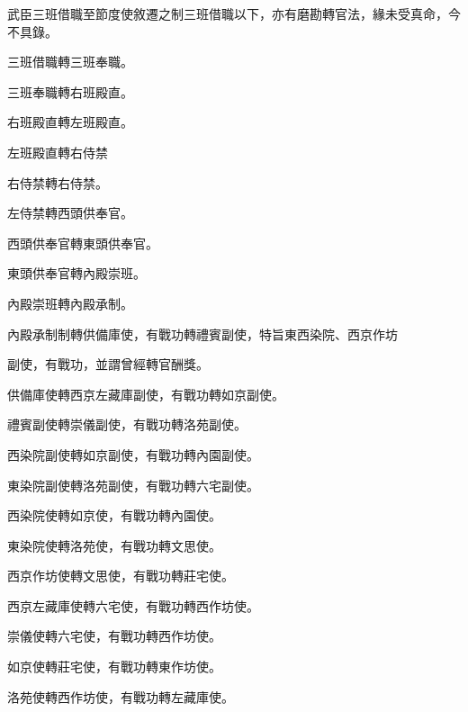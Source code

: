 \begin{pinyinscope}
 武臣三班借職至節度使敘遷之制三班借職以下，亦有磨勘轉官法，緣未受真命，今不具錄。



 三班借職轉三班奉職。



 三班奉職轉右班殿直。



 右班殿直轉左班殿直。



 左班殿直轉右侍禁



 右侍禁轉右侍禁。



 左侍禁轉西頭供奉官。



 西頭供奉官轉東頭供奉官。



 東頭供奉官轉內殿崇班。



 內殿崇班轉內殿承制。



 內殿承制制轉供備庫使，有戰功轉禮賓副使，特旨東西染院、西京作坊



 副使，有戰功，並謂曾經轉官酬獎。



 供備庫使轉西京左藏庫副使，有戰功轉如京副使。



 禮賓副使轉崇儀副使，有戰功轉洛苑副使。



 西染院副使轉如京副使，有戰功轉內園副使。



 東染院副使轉洛苑副使，有戰功轉六宅副使。



 西染院使轉如京使，有戰功轉內園使。



 東染院使轉洛苑使，有戰功轉文思使。



 西京作坊使轉文思使，有戰功轉莊宅使。



 西京左藏庫使轉六宅使，有戰功轉西作坊使。



 崇儀使轉六宅使，有戰功轉西作坊使。



 如京使轉莊宅使，有戰功轉東作坊使。



 洛苑使轉西作坊使，有戰功轉左藏庫使。




\end{pinyinscope}
